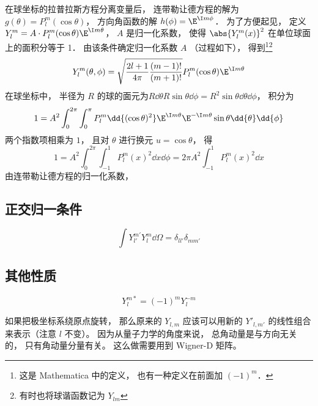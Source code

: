 

在球坐标的拉普拉斯方程分离变量后， 连带勒让德方程的解为 $g(\theta) = P_l^m(\cos\theta)$， 方向角函数的解 $h(\phi) = \E^{\I m\phi}$． 为了方便起见， 定义 $Y_l^m = A \cdot P_l^m(\cos \theta) \E^{\I m\theta}$， $A$ 是归一化系数， 使得 $\abs{Y_l^m (x)}^2$ 在单位球面上的面积分等于 1． 由该条件确定归一化系数 $A$ （过程如下）， 得到\footnote{这是 Mathematica 中的定义， 也有一种定义在前面加 $(-1)^m$．}\footnote{有时也将球谐函数记为 $Y_{lm}$}
\begin{equation}
Y_l^m (\theta ,\phi) = \sqrt{\frac{2l + 1}{4\pi }\frac{(m - 1)!}{(m + 1)!}} P_l^m (\cos\theta) \E^{\I m\theta}
\end{equation}
在球坐标中， 半径为 $R$ 的球的面元为$R \dd{\theta} R\sin\theta \dd{\phi} = R^2 \sin\theta \dd{\theta} \dd{\phi}$，  积分为
\begin{equation}
1 = A^2\int_0^{2\pi } \int_0^\pi  P_l^m \dd{(\cos \theta)^2} \E^{\I m\theta} \E^{-\I m\theta}\sin\theta \dd{\theta} \dd{\phi}
\end{equation}
两个指数项相乘为 $1$，  且对 $\theta$ 进行换元 $u = \cos\theta $， 得
\begin{equation}
1 = A^2 \int_0^{2\pi} \int_{-1}^1 P_l^m {{(x)}^2} \dd{x} \dd{\phi} = 2\pi A^2 \int_{-1}^1 P_l^m (x)^2 \dd{x} 
\end{equation}
由连带勒让德方程的归一化系数， %


\subsection{正交归一条件}
\begin{equation}
\int Y_{l'}^{m'} Y_l^m \dd{\Omega} = \delta_{ll'}\delta_{mm'}
\end{equation}

\subsection{其他性质}
\begin{equation}
Y_l^{m*} = (-1)^m Y_l^{-m}
\end{equation}

如果把极坐标系绕原点旋转， 那么原来的 $Y_{l,m}$ 应该可以用新的 $Y'_{l,m'}$ 的线性组合来表示（注意 $l$ 不变）。 因为从量子力学的角度来说， 总角动量是与方向无关的， 只有角动量分量有关。 这么做需要用到 Wigner-D 矩阵。
